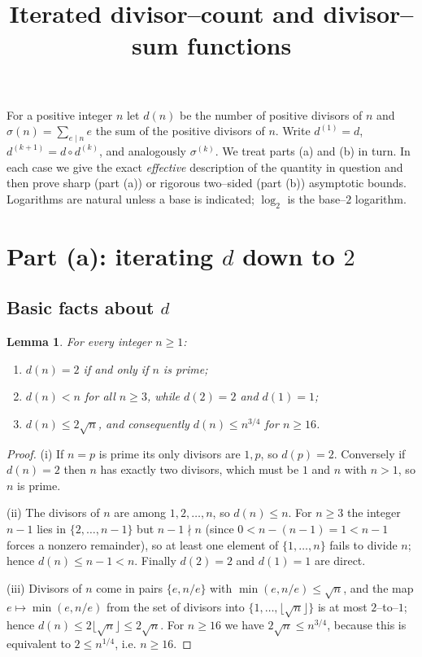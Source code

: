 \documentclass{amsart}
\newtheorem{lemma}{Lemma}
\theoremstyle{definition}
\begin{document}
\title{Iterated divisor--count and divisor--sum functions}
\maketitle

\noindent
For a positive integer $n$ let $d(n)$ be the number of positive divisors of
$n$ and $\sigma(n)=\sum_{e\mid n}e$ the sum of the positive divisors of $n$.
Write $d^{(1)}=d$, $d^{(k+1)}=d\circ d^{(k)}$, and analogously
$\sigma^{(k)}$. We treat parts (a) and (b) in turn. In each case we give the
exact \emph{effective} description of the quantity in question and then prove
sharp (part (a)) or rigorous two--sided (part (b)) asymptotic bounds. Logarithms
are natural unless a base is indicated; $\log_2$ is the base--$2$ logarithm.

\section{Part (a): iterating $d$ down to $2$}

\subsection{Basic facts about $d$}

\begin{lemma}\label{lem:dfacts}
For every integer $n\ge 1$:
\begin{enumerate}
\item[(i)] $d(n)=2$ if and only if $n$ is prime;
\item[(ii)] $d(n)<n$ for all $n\ge 3$, while $d(2)=2$ and $d(1)=1$;
\item[(iii)] $d(n)\le 2\sqrt n$, and consequently $d(n)\le n^{3/4}$ for $n\ge 16$.
\end{enumerate}
\end{lemma}

\begin{proof}
(i) If $n=p$ is prime its only divisors are $1,p$, so $d(p)=2$. Conversely if
$d(n)=2$ then $n$ has exactly two divisors, which must be $1$ and $n$ with
$n>1$, so $n$ is prime.

(ii) The divisors of $n$ are among $1,2,\dots,n$, so $d(n)\le n$. For $n\ge 3$
the integer $n-1$ lies in $\{2,\dots,n-1\}$ but $n-1\nmid n$ (since
$0<n-(n-1)=1<n-1$ forces a nonzero remainder), so at least one element of
$\{1,\dots,n\}$ fails to divide $n$; hence $d(n)\le n-1<n$. Finally $d(2)=2$
and $d(1)=1$ are direct.

(iii) Divisors of $n$ come in pairs $\{e,n/e\}$ with $\min(e,n/e)\le\sqrt n$,
and the map $e\mapsto\min(e,n/e)$ from the set of divisors into
$\{1,\dots,\lfloor\sqrt n\rfloor\}$ is at most $2$--to--$1$; hence
$d(n)\le 2\lfloor\sqrt n\rfloor\le 2\sqrt n$. For $n\ge 16$ we have
$2\sqrt n\le n^{3/4}$, because this is equivalent to $2\le n^{1/4}$, i.e.
$n\ge 16$.
\end{proof}
\end{document}
